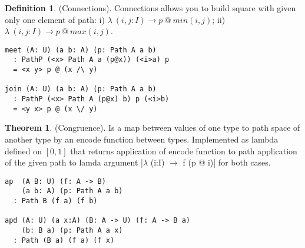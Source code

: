 \documentclass{article}
\theoremstyle{definition}
\newtheorem{theorem}{Theorem}
\newtheorem{definition}{Definition}
\begin{document}
\begin{definition} (Connections).
Connections allows you to build square
with given only one element of path: i) $\lambda\ (i,j: I) \rightarrow p\ @\ min(i,j)$;
ii) $\lambda\ (i,j:I) \rightarrow p\ @\ max(i,j)$.
\begin{center}
\end{center}
\begin{lstlisting}
meet (A: U) (a b: A) (p: Path A a b)
  : PathP (<x> Path A a (p@x)) (<i>a) p
  = <x y> p @ (x /\ y)

join (A: U) (a b: A) (p: Path A a b)
  : PathP (<x> Path A (p@x) b) p (<i>b)
  = <y x> p @ (x \/ y)
\end{lstlisting}
\end{definition}

\begin{theorem} (Congruence).
Is a map between values of one type
to path space of another type by an encode function between types.
Implemented as lambda defined on $[0,1]$ that returns
application of encode function to path application of
the given path to lamda argument |$\lambda$ (i:I) $\rightarrow$ f (p @ i)|
for both cases.
\begin{lstlisting}
ap  (A B: U) (f: A -> B)
    (a b: A) (p: Path A a b)
  : Path B (f a) (f b)

apd (A: U) (a x:A) (B: A -> U) (f: A -> B a)
    (b: B a) (p: Path A a x)
  : Path (B a) (f a) (f x)
\end{lstlisting}
\end{theorem}
\end{document}
